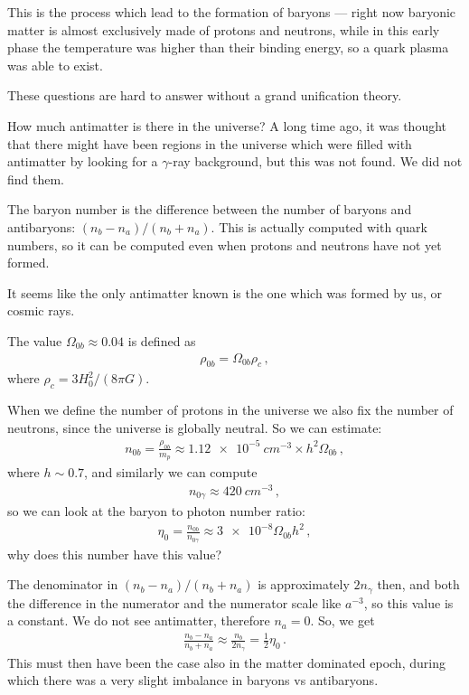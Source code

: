 \documentclass[main.tex]{subfiles}
\begin{document}
This is the process which lead to the formation of baryons --- right now baryonic matter is almost exclusively made of protons and neutrons, while in this early phase the temperature was higher than their binding energy, so a quark plasma was able to exist. 


These questions are hard to answer without a grand unification theory.

How much antimatter is there in the universe?
A long time ago, it was thought that there might have been regions in the universe which were filled with antimatter by looking for a \(\gamma \)-ray background, but this was not found.
We did not find them.

The baryon number is the difference between the number of baryons and antibaryons: \((n_b - n_a) / (n_b + n_a)\). This is actually computed with quark numbers, so it can be computed even when protons and neutrons have not yet formed.

It seems like the only antimatter known is the one which was formed by us, or cosmic rays.

The value \(\Omega_{0b} \approx 0.04\) is defined as 
%
\begin{align}
  \rho_{0b} = \Omega_{0b} \rho _{c} 
\,,
\end{align}
%
where \(\rho_c = 3 H_0^2 / (8 \pi G)\).

When we define the number of protons in the universe we also fix the number of neutrons, since the universe is globally neutral.
So we can estimate: 
%
\begin{align}
  n_{0b} = \frac{\rho_{0b}}{m_p} \approx \SI{1.12e-5}{cm^{-3}} \times h^2 \Omega_{0b}
\,,
\end{align}
%
where \(h \sim 0.7\),
and similarly we can compute 
%
\begin{align}
  n_{0 \gamma } \approx \SI{420}{cm^{-3}}
\,,
\end{align}
%
so we can 
look at the baryon to photon number ratio: 
%
\begin{align}
  \eta_0  = \frac{n_{0b}}{n_{0\gamma}}
  \approx \num{3e-8} \Omega_{0b} h^2
\,,
\end{align}
%
why does this number have this value? 

The denominator in \((n_b - n_a) / (n_b + n_a)\) is approximately \(2 n_{\gamma }\) then, and both the difference in the numerator and the numerator scale like \(a^{-3}\), so this value is a constant.
We do not see antimatter, therefore \(n_a = 0\). So, we get 
%
\begin{align}
    \frac{n_b - n_a}{n_b + n_a} \approx \frac{n_b}{2 n_\gamma } = \frac{1}{2} \eta_0 
\,.
\end{align}
%
This must then have been the case also in the matter dominated epoch, during which there was a very slight imbalance in baryons vs antibaryons.
\end{document}
